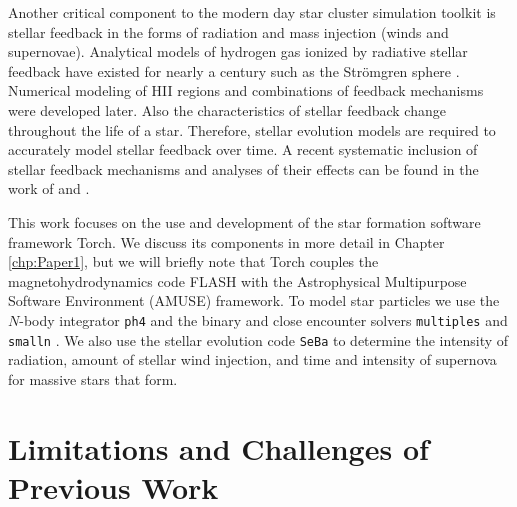 \documentclass[twoside]{drexel-thesis}
\begin{document}
\begin{thesis}
Another critical component to the modern day star cluster simulation toolkit is stellar feedback in the forms of radiation and mass injection (winds and supernovae). Analytical models of hydrogen gas ionized by radiative stellar feedback have existed for nearly a century such as the Str\"omgren sphere \citep{stromgren_physical_1939}. Numerical modeling of HII regions \citep{tenorio-tagle_gas_1979} and combinations of feedback mechanisms \citep{yorke_combined_1989} were developed later. Also the characteristics of stellar feedback change throughout the life of a star. Therefore, stellar evolution models are required to accurately model stellar feedback over time. A recent systematic inclusion of stellar feedback mechanisms and analyses of their effects can be found in the work of \citet{dale_ionizing_2012} and \citet{dale_before_2014}.

This work focuses on the use and development of the star formation software framework Torch. We discuss its components in more detail in Chapter \ref{chp:Paper1}, but we will briefly note that Torch couples the magnetohydrodynamics code FLASH with the Astrophysical Multipurpose Software Environment (AMUSE) framework. To model star particles we use the $N$-body integrator \texttt{ph4} and the binary and close encounter solvers \texttt{multiples} \citep{portegies_zwart_astrophysical_2018} and \texttt{smalln} \citep{hut_building_1995,mcmillan_binary--single-star_1996}. We also use the stellar evolution code \texttt{SeBa} \citep{portegies_zwart_population_1996} to determine the intensity of radiation, amount of stellar wind injection, and time and intensity of supernova for massive stars that form.


\section{Limitations and Challenges of Previous Work}


\end{thesis}
\end{document}
